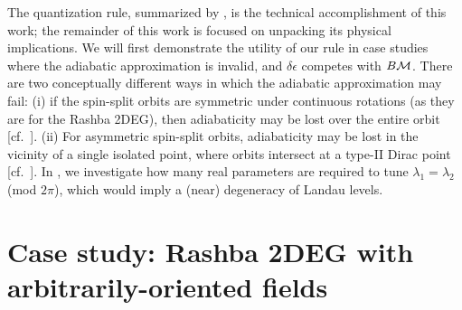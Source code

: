 \documentclass[aps, prb, showpacs, twocolumn, notitlepage, superscriptaddress]{revtex4-1}
\begin{document}






The quantization rule, summarized by , is the technical accomplishment of this work; the remainder of this work is focused on unpacking its physical implications. We will first demonstrate the utility of our rule in case studies where the adiabatic approximation is invalid, and $\delta \epsilon$ competes with $B{\cal M}$. There are two conceptually different ways in which the adiabatic approximation may fail: (i) if the spin-split orbits are  symmetric under continuous rotations (as they are for the Rashba 2DEG), then adiabaticity may be lost over the entire orbit [cf.\ ]. (ii) For asymmetric spin-split orbits, adiabaticity may be lost in the vicinity of a single isolated point, where orbits intersect at a type-II Dirac point [cf.\ ]. 
In , we investigate how many real parameters are required to tune $\lambda_1{=}\lambda_2$ (mod $2\pi$), which would imply a (near) degeneracy of Landau levels.  




\section{Case study: Rashba 2DEG with arbitrarily-oriented fields}

\end{document}
